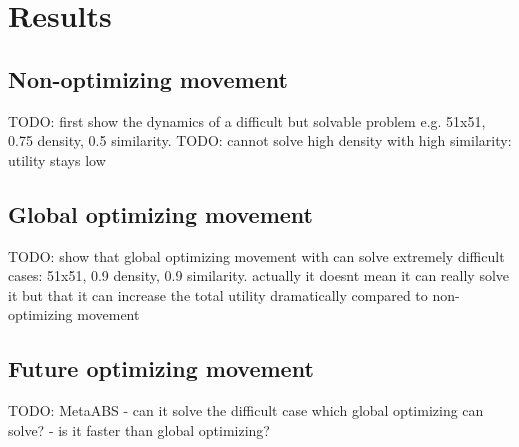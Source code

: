 \section{Results}

\subsection{Non-optimizing movement}
TODO: first show the dynamics of a difficult but solvable problem e.g. 51x51, 0.75 density, 0.5 similarity. 
TODO: cannot solve high density with high similarity: utility stays low

\subsection{Global optimizing movement}
TODO: show that global optimizing movement with can solve extremely difficult cases: 51x51, 0.9 density, 0.9 similarity. actually it doesnt mean it can really solve it but that it can increase the total utility dramatically compared to non-optimizing movement

\subsection{Future optimizing movement}
TODO: MetaABS
	- can it solve the difficult case which global optimizing can solve?
	- is it faster than global optimizing?